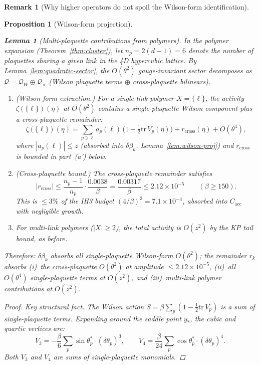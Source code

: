 \documentclass[11pt]{article}
\newtheorem{lemma}[theorem]{Lemma}
\newtheorem{proposition}[theorem]{Proposition}
\theoremstyle{definition}
\newtheorem{remark}[theorem]{Remark}
\newcommand{\tr}{\mathrm{tr}}
\begin{document}
\begin{remark}[Why higher operators do not spoil the Wilson-form identification]
\begin{proposition}[Wilson-form projection]
\begin{enumerate}[nosep,label=(\roman*)]
\begin{lemma}[Multi-plaquette contributions from
polymers]\label{lem:multi-plaq}
In the polymer expansion (Theorem~\ref{thm:cluster}),
let $n_p=2(d{-}1)=6$ denote the number of plaquettes sharing
a given link in the 4D hypercubic lattice.
By Lemma~\ref{lem:quadratic-sector}, the $O(\theta^2)$
gauge-invariant sector decomposes as
$\mathcal{Q}=\mathcal{Q}_W\oplus\mathcal{Q}_\times$
(Wilson plaquette terms $\oplus$ cross-plaquette bilinears).
\begin{enumerate}[nosep,label=(\alph*)]
\item \emph{(Wilson-form extraction.)}
For a single-link polymer $X=\{\ell\}$, the activity
$\zeta(\{\ell\})(\eta)$ at $O(\theta^2)$ contains a
\emph{single-plaquette} Wilson component plus a cross-plaquette
remainder:
\begin{equation}\label{eq:single-link-decomp}
\zeta(\{\ell\})(\eta)
=\sum_{p\ni\ell}a_p(\ell)\,
\bigl(1-\tfrac{1}{2}\tr\,V_p(\eta)\bigr)
+r_{\mathrm{cross}}(\eta)
+O(\theta^4),
\end{equation}
where $|a_p(\ell)|\le z$ (absorbed into $\delta\beta_k$,
Lemma~\ref{lem:wilson-proj}) and $r_{\mathrm{cross}}$
is bounded in part~(a') below.
\item[(a')] \emph{(Cross-plaquette bound.)}
The cross-plaquette remainder satisfies
\begin{equation}\label{eq:cross-bound}
|r_{\mathrm{cross}}|\le\frac{n_p{-}1}{n_p}
\cdot\frac{0.0038}{\beta}
=\frac{0.00317}{\beta}
\le 2.12\times 10^{-5}
\qquad(\beta\ge 150).
\end{equation}
This is $\le 3\%$ of the IH3 budget
$(4/\beta)^2=7.1\times 10^{-4}$, absorbed into
$C_{\mathrm{acc}}$ with negligible growth.
\item[(b)] For multi-link polymers ($|X|\ge 2$), the total activity
is $O(z^2)$ by the KP tail bound, as before.
\end{enumerate}
Therefore: $\delta\beta_k$ absorbs all single-plaquette Wilson-form
$O(\theta^2)$; the remainder $r_k$ absorbs (i)~the cross-plaquette
$O(\theta^2)$ at amplitude $\le 2.12\times 10^{-5}$,
(ii)~all $O(\theta^4)$ single-plaquette terms at $O(z^2)$, and
(iii)~multi-link polymer contributions at $O(z^2)$.
\end{lemma}

\begin{proof}
\emph{Key structural fact.}  The Wilson action
$S=\beta\sum_p(1-\frac{1}{2}\tr\,V_p)$ is a sum of
\emph{single-plaquette} terms.  Expanding around the
saddle point $y_*$, the cubic and quartic vertices are:
\begin{equation}
V_3=-\frac{\beta}{6}\sum_p\sin\theta_p^*\cdot(\delta\theta_p)^3,
\qquad
V_4=\frac{\beta}{24}\sum_p\cos\theta_p^*\cdot(\delta\theta_p)^4.
\end{equation}
Both $V_3$ and $V_4$ are sums of single-plaquette monomials.


\end{proof}
\end{enumerate}
\end{proposition}
\end{remark}
\end{document}
